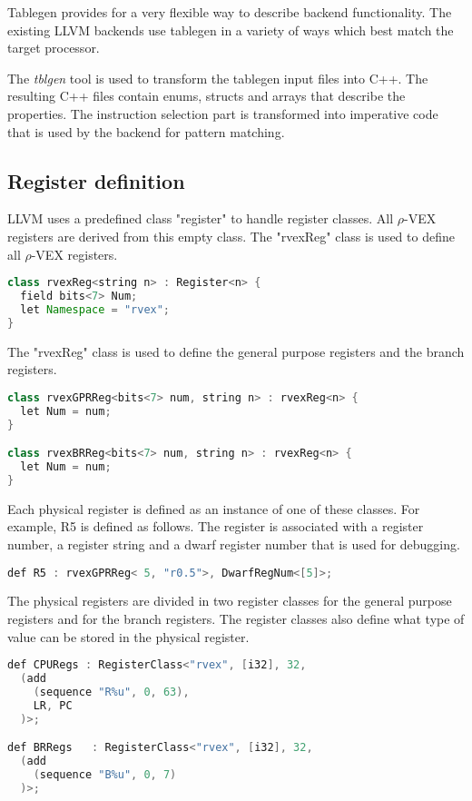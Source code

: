 Tablegen provides for a very flexible way to describe backend functionality. The existing LLVM backends use tablegen in a variety of ways which best match the target processor. 

The \emph{tblgen} tool is used to transform the tablegen input files into C++. The resulting C++ files contain enums, structs and arrays that describe the properties. The instruction selection part is transformed into imperative code that is used by the backend for pattern matching. 

\subsection{Register definition}
LLVM uses a predefined class "register" to handle register classes. All $\rho$-VEX registers are derived from this empty class. The "rvexReg" class is used to define all $\rho$-VEX registers. 

\begin{lstlisting}[language=java]
class rvexReg<string n> : Register<n> {
  field bits<7> Num;
  let Namespace = "rvex";
}
\end{lstlisting}

The "rvexReg" class is used to define the general purpose registers and the branch registers.
\begin{lstlisting}[language=java]
class rvexGPRReg<bits<7> num, string n> : rvexReg<n> {
  let Num = num;
}

class rvexBRReg<bits<7> num, string n> : rvexReg<n> {
  let Num = num;
}
\end{lstlisting}

Each physical register is defined as an instance of one of these classes. For example, R5 is defined as follows. The register is associated with a register number, a register string and a dwarf register number that is used for debugging.

\begin{lstlisting}[language=java]
def R5 : rvexGPRReg< 5, "r0.5">, DwarfRegNum<[5]>;
\end{lstlisting}

The physical registers are divided in two register classes for the general purpose registers and for the branch registers. The register classes also define what type of value can be stored in the physical register.

\begin{lstlisting}[language=java]
def CPURegs : RegisterClass<"rvex", [i32], 32, 
  (add
    (sequence "R%u", 0, 63),
    LR, PC
  )>;

def BRRegs   : RegisterClass<"rvex", [i32], 32, 
  (add 
    (sequence "B%u", 0, 7)
  )>;
\end{lstlisting}

